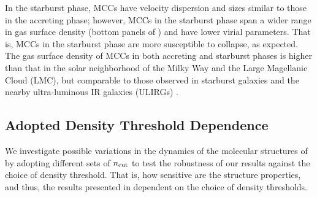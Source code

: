 \IfFileExists{emulateapjlegacy.cls}{\documentclass[iop]{emulateapjlegacy}}{\documentclass[iop]{emulateapj}}
\begin{document}
In the starburst phase, MCCs have velocity dispersion and sizes similar to those in the accreting phase; however, 
MCCs in the starburst phase span a wider range in gas surface density 
(bottom panels of ) and have lower virial parameters.
That is, MCCs in the starburst phase are more susceptible to collapse, as expected.
The gas surface density of MCCs in both accreting and starburst phases is higher than that in the solar neighborhood
of the Milky Way and the Large Magellanic Cloud (LMC), but comparable to those observed in starburst galaxies and the nearby 
ultra-luminous IR galaxies (ULIRGs) \citep{Boulares90a, Scoville91a, Weiss01a, Hughes10a, Leroy15a}.
%

\subsection{Adopted Density Threshold Dependence}\label{sec:ncut}

We investigate possible variations in the dynamics of the molecular structures of \flower 
by adopting different sets of $n_{\rm cut}$ %
to test the robustness of our results against the choice of density threshold. 
That is, how sensitive are the structure properties, and thus, the 
results presented in  dependent on the choice of density thresholds.
\end{document}
